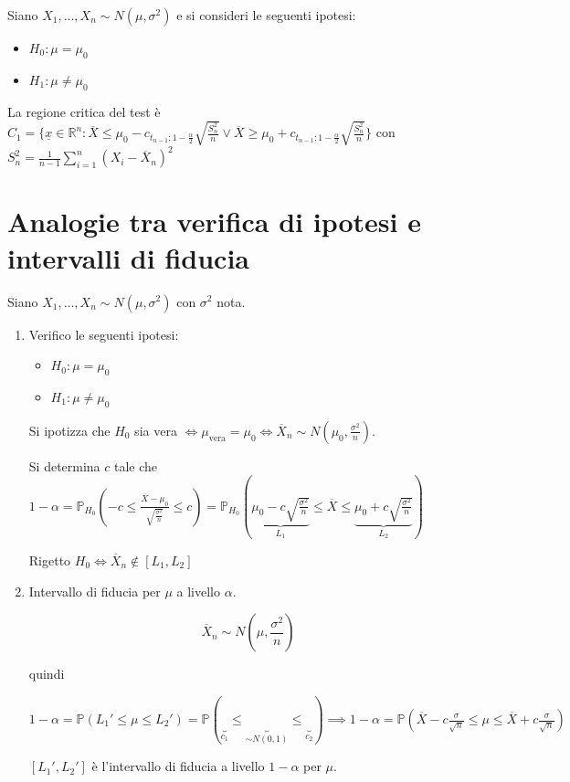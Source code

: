 \documentclass[hidelinks, 10pt]{report}
\begin{document}
\begin{es}
Siano $ X_{1}, \dotsc, X_{n} \sim N(\mu, \sigma^{2}) $ e si consideri le  seguenti ipotesi:
\begin{itemize}
\item $ H_{0}: \mu = \mu_{0} $
\item $ H_{1}: \mu \ne \mu_{0} $
\end{itemize}

La regione critica del test \`e $ C_{1} = \{ \underline{x} \in \mathbb{R}^{n} : \overline{X} \le \mu_{0} - c_{t_{n - 1}; 1 - \frac{\alpha}{2}} \sqrt{\frac{S_{n}^{2}}{n}} \lor \overline{X} \ge \mu_{0} + c_{t_{n - 1}; 1 - \frac{\alpha}{2}} \sqrt{\frac{S_{n}^{2}}{n}} \} $ con $ S_{n}^{2} = \frac{1}{n - 1} \sum\limits_{i = 1}^{n} (X_{i} - \overline{X}_{n})^{2} $

\end{es}

\section{Analogie tra verifica di ipotesi e intervalli di fiducia}

Siano $ X_{1}, \dotsc, X_{n} \sim N(\mu, \sigma^{2}) $ con $ \sigma^{2} $ nota.

\begin{enumerate}
\item Verifico le seguenti ipotesi:
\begin{itemize}
\item $ H_{0}: \mu = \mu_{0} $
\item $ H_{1}: \mu \ne \mu_{0} $
\end{itemize}

Si ipotizza che $ H_{0} $ sia vera $ \iff \mu_{\text{vera}} = \mu_{0} \iff \overline{X}_{n} \sim N \left( \mu_{0}, \frac{\sigma^{2}}{n} \right) $.

Si determina $ c $ tale che $ 1 - \alpha = \mathbb{P}_{H_{0}} \left( -c \le \frac{\overline{X} - \mu_{0}}{\sqrt{\frac{\sigma^{2}}{n}}} \le c \right) = \mathbb{P}_{H_{0}} \left( \underbrace{\mu_{0} - c \sqrt{\frac{\sigma^{2}}{n}}}_{L_{1}} \le \overline{X} \le \underbrace{\mu_{0} + c \sqrt{\frac{\sigma^{2}}{n}}}_{L_{2}} \right) $


Rigetto $ H_{0} \iff \overline{X}_{n} \not\in [L_{1}, L_{2}] $
\item Intervallo di fiducia per $ \mu $ a livello $ \alpha $.

\[ \overline{X}_{n} \sim N \left( \mu, \frac{\sigma^{2}}{n} \right) \]

quindi

$  1 - \alpha = \mathbb{P} (L_{1}' \le \mu \le L_{2}') = \mathbb{P} \left( \underbrace{\frac{}{}}_{c_{1}} \le \underbrace{\frac{}{}}_{\sim N(0, 1)} \le \underbrace{\frac{}{}}_{c_{2}} \right) \implies 1 - \alpha = \mathbb{P} \left( \overline{X} - c \frac{\sigma}{\sqrt{n}} \le \mu \le \overline{X} + c \frac{\sigma}{\sqrt{n}} \right) $

$ [L_{1}', L_{2}'] $ \`e l'intervallo di fiducia a livello $ 1 - \alpha $ per $ \mu $. 
\end{enumerate}
\end{document}
